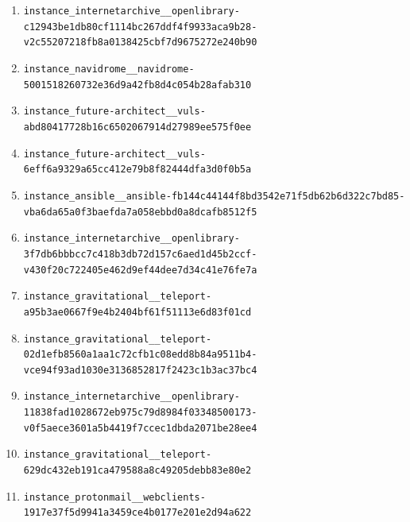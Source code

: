 \begin{enumerate}
\item \texttt{instance\_\allowbreak{}internetarchiv\allowbreak{}e\_\allowbreak{}\_\allowbreak{}openlibrary-\allowbreak{}c12943be1db80c\allowbreak{}f1114bc267ddf4\allowbreak{}f9933aca9b28-\allowbreak{}v2c55207218fb8\allowbreak{}a0138425cbf7d9\allowbreak{}675272e240b90}
\item \texttt{instance\_\allowbreak{}navidrome\_\allowbreak{}\_\allowbreak{}navidrome-\allowbreak{}5001518260732e\allowbreak{}36d9a42fb8d4c0\allowbreak{}54b28afab310}
\item \texttt{instance\_\allowbreak{}future-\allowbreak{}architect\_\allowbreak{}\_\allowbreak{}vuls-\allowbreak{}abd80417728b16\allowbreak{}c6502067914d27\allowbreak{}989ee575f0ee}
\item \texttt{instance\_\allowbreak{}future-\allowbreak{}architect\_\allowbreak{}\_\allowbreak{}vuls-\allowbreak{}6eff6a9329a65c\allowbreak{}c412e79b8f8244\allowbreak{}4dfa3d0f0b5a}
\item \texttt{instance\_\allowbreak{}ansible\_\allowbreak{}\_\allowbreak{}ansible-\allowbreak{}fb144c44144f8b\allowbreak{}d3542e71f5db62\allowbreak{}b6d322c7bd85-\allowbreak{}vba6da65a0f3ba\allowbreak{}efda7a058ebbd0\allowbreak{}a8dcafb8512f5}
\item \texttt{instance\_\allowbreak{}internetarchiv\allowbreak{}e\_\allowbreak{}\_\allowbreak{}openlibrary-\allowbreak{}3f7db6bbbcc7c4\allowbreak{}18b3db72d157c6\allowbreak{}aed1d45b2ccf-\allowbreak{}v430f20c722405\allowbreak{}e462d9ef44dee7\allowbreak{}d34c41e76fe7a}
\item \texttt{instance\_\allowbreak{}gravitational\_\allowbreak{}\_\allowbreak{}teleport-\allowbreak{}a95b3ae0667f9e\allowbreak{}4b2404bf61f511\allowbreak{}13e6d83f01cd}
\item \texttt{instance\_\allowbreak{}gravitational\_\allowbreak{}\_\allowbreak{}teleport-\allowbreak{}02d1efb8560a1a\allowbreak{}a1c72cfb1c08ed\allowbreak{}d8b84a9511b4-\allowbreak{}vce94f93ad1030\allowbreak{}e3136852817f24\allowbreak{}23c1b3ac37bc4}
\item \texttt{instance\_\allowbreak{}internetarchiv\allowbreak{}e\_\allowbreak{}\_\allowbreak{}openlibrary-\allowbreak{}11838fad102867\allowbreak{}2eb975c79d8984\allowbreak{}f03348500173-\allowbreak{}v0f5aece3601a5\allowbreak{}b4419f7ccec1db\allowbreak{}da2071be28ee4}
\item \texttt{instance\_\allowbreak{}gravitational\_\allowbreak{}\_\allowbreak{}teleport-\allowbreak{}629dc432eb191c\allowbreak{}a479588a8c4920\allowbreak{}5debb83e80e2}
\item \texttt{instance\_\allowbreak{}protonmail\_\allowbreak{}\_\allowbreak{}webclients-\allowbreak{}1917e37f5d9941\allowbreak{}a3459ce4b0177e\allowbreak{}201e2d94a622}

\end{enumerate}
